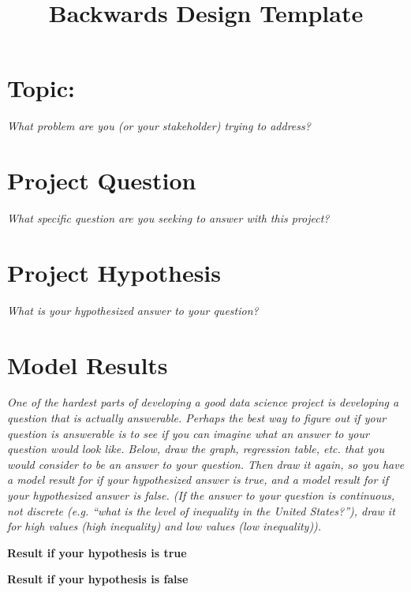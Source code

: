 \documentclass[12pt]{article}
\title{Backwards Design Template}
\begin{document}
\maketitle

\section{Topic:}
\emph{What problem are you (or your stakeholder) trying to address?}
\vspace*{2cm}\\

\section{Project Question}
\emph{What specific question are you seeking to answer with this project?}
\vspace*{2cm}\\

\section{Project Hypothesis}
\emph{What is your hypothesized answer to your question?}
\vspace*{2cm}\\

\section{Model Results}
\emph{One of the hardest parts of developing a good data science project is developing a question that is actually answerable. Perhaps the best way to figure out if your question is answerable is to see if you can imagine what an answer to your question would look like. Below, draw the graph, regression table, etc. that you would consider to be an answer to your question. Then draw it again, so you have a model result for if your hypothesized answer is true, and a model result for if your hypothesized answer is false. (If the answer to your question is continuous, not discrete (e.g. ``what is the level of inequality in the United States?''), draw it for high values (high inequality) and low values (low inequality)).}

\begin{minipage}{0.5\textwidth}
\centering
\textbf{Result if your hypothesis is true}
\end{minipage}
\begin{minipage}{0.5\textwidth}
\centering
\textbf{Result if your hypothesis is false}
\end{minipage}
\vspace*{5cm}\\
\end{document}
